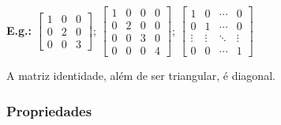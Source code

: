 \documentclass[a4paper,12pt]{article}
\begin{document}
\textbf{E.g.:} $ \begin{bmatrix}
1 & 0 & 0 \\
0 & 2 & 0 \\
0 & 0 & 3
\end{bmatrix}$; $ \begin{bmatrix} 1 & 0 & 0 & 0 \\ 0 & 2 & 0 & 0 \\ 0 & 0 & 3 & 0 \\ 0 & 0 & 0 & 4 \end{bmatrix} $; $ \begin{bmatrix}
 1 & 0 &  \cdots & 0 \\
 0 & 1 &  \cdots & 0 \\
 \vdots & \vdots & \ddots & \vdots  \\ 
0 & 0  & \cdots & 1
 \end{bmatrix} $

A matriz identidade, além de ser triangular, é diagonal.

\subsubsection{Propriedades}
\end{document}
